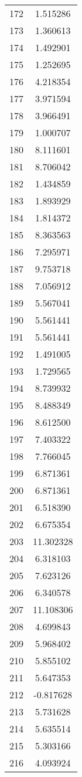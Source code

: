 \documentclass[12pt]{article}
\begin{document}
\begin{longtable}{@{}cc@{}}
172 & 1.515286 \\
173 & 1.360613 \\
174 & 1.492901 \\
175 & 1.252695 \\
176 & 4.218354 \\
177 & 3.971594 \\
178 & 3.966491 \\
179 & 1.000707 \\
180 & 8.111601 \\
181 & 8.706042 \\
182 & 1.434859 \\
183 & 1.893929 \\
184 & 1.814372 \\
185 & 8.363563 \\
186 & 7.295971 \\
187 & 9.753718 \\
188 & 7.056912 \\
189 & 5.567041 \\
190 & 5.561441 \\
191 & 5.561441 \\
192 & 1.491005 \\
193 & 1.729565 \\
194 & 8.739932 \\
195 & 8.488349 \\
196 & 8.612500 \\
197 & 7.403322 \\
198 & 7.766045 \\
199 & 6.871361 \\
200 & 6.871361 \\
201 & 6.518390 \\
202 & 6.675354 \\
203 & 11.302328 \\
204 & 6.318103 \\
205 & 7.623126 \\
206 & 6.340578 \\
207 & 11.108306 \\
208 & 4.699843 \\
209 & 5.968402 \\
210 & 5.855102 \\
211 & 5.647353 \\
212 & -0.817628 \\
213 & 5.731628 \\
214 & 5.635514 \\
215 & 5.303166 \\
216 & 4.093924 \\

\end{longtable}
\end{document}
